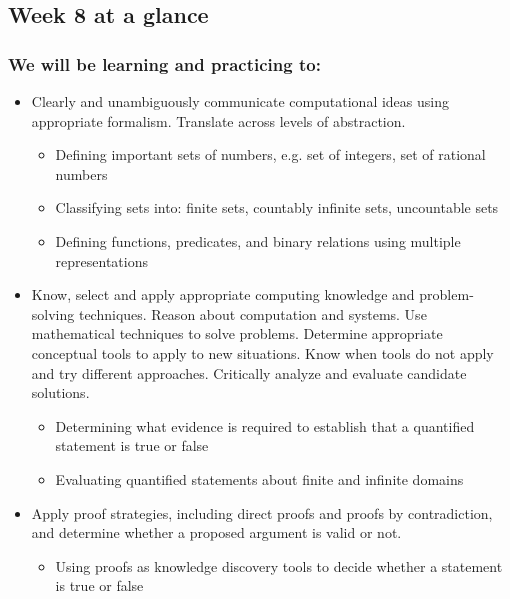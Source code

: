 

\subsection*{Week 8 at a glance}

\subsubsection*{We will be learning and practicing to:}
\begin{itemize}

\item Clearly and unambiguously communicate computational ideas using appropriate formalism. Translate across levels of abstraction.
\begin{itemize}
    \item Defining important sets of numbers, e.g. set of integers, set of rational numbers
    \item Classifying sets into: finite sets, countably infinite sets, uncountable sets
    \item Defining functions, predicates, and binary relations using multiple representations
\end{itemize}

\item Know, select and apply appropriate computing knowledge and problem-solving techniques. Reason about computation and systems. Use mathematical techniques to solve problems. Determine appropriate conceptual tools to apply to new situations. Know when tools do not apply and try different approaches. Critically analyze and evaluate candidate solutions.
\begin{itemize}
    \item Determining what evidence is required to establish that a quantified statement is true or false
    \item Evaluating quantified statements about finite and infinite domains
\end{itemize}

\item Apply proof strategies, including direct proofs and proofs by contradiction, and determine whether a proposed argument is valid or not.
\begin{itemize}
    \item Using proofs as knowledge discovery tools to decide whether a statement is true or false
\end{itemize}
\end{itemize}

